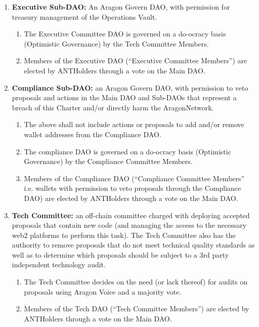 \begin{enumerate}
\begin{enumerate}
		\begin{enumerate}
			\item \textbf{Executive Sub-\ac{DAO}:} An Aragon Govern \ac{DAO}, with permission for treasury management of the Operations Vault.
			\begin{enumerate}
				\item The Executive Committee \ac{DAO} is governed on a do-ocracy basis (Optimistic Governance) by the Tech Committee Members.
				\item Members of the Executive \ac{DAO} (``Executive Committee Members'') are elected by \glspl{ANTHolder} through a vote on the Main \ac{DAO}.
			\end{enumerate}
			\item \textbf{Compliance Sub-\ac{DAO}:} an Aragon Govern \ac{DAO}, with permission to veto proposals and actions in the Main \ac{DAO} and Sub-\acp{DAO} that represent a breach of this Charter and/or directly harm the \gls{AragonNetwork}.
			\begin{enumerate}
				\item The above shall not include actions or proposals to add and/or remove wallet addresses from the Compliance \ac{DAO}.
				\item The compliance \ac{DAO} is governed on a do-ocracy basis (Optimistic Governance) by the Compliance Committee Members.
				\item Members of the Compliance \ac{DAO} (``Compliance Committee Members'' i.e. wallets with permission to veto proposals through the Compliance \ac{DAO}) are elected by \glspl{ANTHolder} through a vote on the Main \ac{DAO}.
			\end{enumerate}
			\item \textbf{Tech Committee:} an off-chain committee charged with deploying accepted proposals that contain new code (and managing the access to the necessary web2 platforms to perform this task). The Tech Committee also has the authority to remove proposals that do not meet technical quality standards as well as to determine which proposals should be subject to a 3rd party independent technology audit.
			\begin{enumerate}
				\item The Tech Committee decides on the need (or lack thereof) for audits on proposals using Aragon Voice and a majority vote.
				\item Members of the Tech \ac{DAO} (``Tech Committee Members'') are elected by \glspl{ANTHolder} through a vote on the Main \ac{DAO}.
			\end{enumerate}


\end{enumerate}
\end{enumerate}
\end{enumerate}
